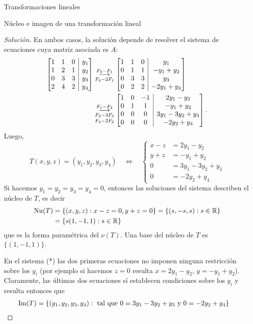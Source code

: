 \begin{chapter}{Transformaciones lineales}
\begin{section}{N\'ucleo e imagen de una transformaci\'on lineal}
\begin{proof}[Solución]
    En  ambos casos, la solución depende de resolver el sistema de ecuaciones cuya matriz asociada es $A$:
    \begin{align*}
    \left[\begin{array}{@{}*{3}{c}|c@{}}1&1&0&y_1\\1&2&1&y_2\\0&3&3&y_3\\2&4&2&y_4 \end{array}\right]
    &\underset{F_4-2F_1}{\stackrel{F_2 -F_1}{\longrightarrow}} 
    \left[\begin{array}{@{}*{3}{c}|c@{}}1&1&0&y_1\\0&1&1&-y_1+y_2\\0&3&3&y_3\\0&2&2&-2y_1 +y_4 \end{array}\right]\\
    &\underset{F_4-2F_2}{\underset{F_3-3F_2}{\stackrel{F_1 -F_2}{\longrightarrow}} } 
    \left[\begin{array}{@{}*{3}{c}|c@{}}1&0&-1&2y_1-y_2\\0&1&1&-y_1+y_2\\0&0&0&3y_1-3y_2+y_3\\0&0&0&-2y_2 +y_4 \end{array}\right].
    \end{align*}
Luego, 
    \begin{equation*}\label{eq-gen}
    T(x,y,z) = (y_1,y_2,y_3,y_4) \quad\Leftrightarrow \quad
    \left\{\begin{array}{rl}
    x -z &= 2y_1-y_2\\ 
    y +z &= -y_1+y_2\\
    0&=3y_1-3y_2+y_3 \\
    0&= -2y_2 +y_4
    \end{array}\right.\tag{*}
    \end{equation*}
    Si hacemos $y_1 = y_2 = y_3 = y_4 = 0$, entonces las soluciones del sistema describen el núcleo de $T$, es decir
    \begin{align*}
    \operatorname{Nu}(T) &= \{(x,y,z):x-z=0, y+z =0 \} = \{(s,-s,s):s \in \mathbb R \} \\
    &= \{s(1,-1,1):s \in \mathbb R \}
    \end{align*}
    que es la forma paramétrica del $\nu(T)$. Una base del núcleo de $T$  es $\{(1,-1,1)\}$. 


    En  el sistema (*) las dos primeras ecuaciones no imponen ninguna restricción sobre los $y_i$ (por ejemplo si hacemos $z=0$ resulta $x = 2y_1-y_2$,  $y= -y_1+y_2$). Claramente, las últimas dos ecuaciones sí establecen condiciones sobre los $y_i$ y resulta entonces que   
    \begin{align*}
        \operatorname{Im}(T) &=  \{(y_1,y_2,y_3,y_4): \text{ tal que $0=3y_1-3y_2+y_3$ y $0= -2y_2 +y_4$} \} 
    \end{align*}
    

\end{proof}
\end{section}
\end{chapter}
